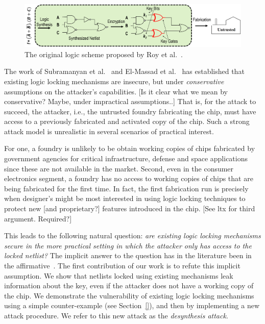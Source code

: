 \begin{figure}
  \centering\includegraphics[width=.8\linewidth]{./figs/lenc-v1}
  \caption{The original logic scheme proposed by Roy et al.~\cite{}.}
  \label{fig:llock}
\end{figure}


The work of 
Subramanyan et al.~\cite{} and El-Massad et al.~\cite{} 
has established that 
existing logic 
locking mechanisms are insecure, but 
under \emph{conservative}  
assumptions on the attacker's capabilities.
[Is it clear what we mean by conservative? Maybe, under impractical assumptions..] 
That is, for the
attack to succeed, the attacker, i.e., the untrusted foundry fabricating the chip, 
must have access to a previously fabricated and 
activated copy of the chip.
Such a strong attack model 
is unrealistic in several scenarios of 
practical interest. 

For one, a foundry is unlikely to 
be obtain working copies of 
chips fabricated by government agencies for 
critical infrastructure, defense and space applications 
since these are not available in the market.  
Second, even in the consumer electronics segment, a foundry 
has no access to working copies of
chips that are being fabricated for the first time. 
In fact, the first fabrication run is precisely 
when designer's 
might be most interested in using logic locking techniques to 
protect new [and proprietary?] features introduced in the chip. 
[See ltx for third argument. Required?]

This leads to the following natural question: \emph{are existing 
logic locking mechanisms secure in the more 
practical setting in which the attacker only has access to the 
locked netlist?} The implicit answer to the question 
has in the literature been in the affirmative~\cite{roy2008epic}. 
The first contribution of our work is 
to refute this implicit assumption. 
We show that netlists locked using 
existing mechanisms leak information about the key, even if the attacker does not have a working copy of the chip.
We demonstrate the vulnerability 
of existing logic locking mechanisms using a simple counter-example (see Section~\ref{}), and then by implementing a new attack 
procedure. We refer to this new attack as the
\emph{desynthesis attack}. 



